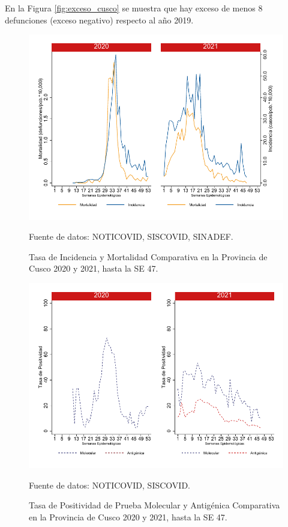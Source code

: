 \documentclass[12pt,a4paper,openany]{book}
\begin{document}
	En la Figura \ref{fig:exceso_cusco} se muestra que hay exceso de menos 8 defunciones (exceso negativo) respecto al año 2019.
		
		\begin{figure}[h]
			\caption{Tasa de Incidencia y Mortalidad Comparativa en la Provincia de Cusco 2020 y 2021, hasta la SE 47.}\label{fig:inc_mort_cusco}
			\begin{center}
				\includegraphics[width=0.7\linewidth]{../figuras/incidencia_mortalidad_20_21_7}
			\end{center}
			{\footnotesize {Fuente de datos: NOTICOVID, SISCOVID, SINADEF.}}
		\end{figure}
		
		\begin{figure}[h]
			\caption{Tasa de Positividad de Prueba Molecular y Antigénica Comparativa en la Provincia de Cusco 2020 y 2021, hasta la SE 47.}\label{fig:positividad_cusco}
			\begin{center}
				\includegraphics[width=0.7\linewidth]{../figuras/positividad_20_21_7}
			\end{center}
			{\footnotesize {Fuente de datos: NOTICOVID, SISCOVID.}}
		\end{figure}
		
\end{document}
